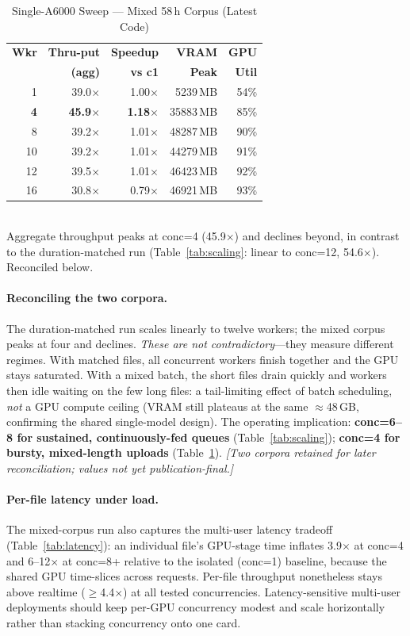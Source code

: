 \documentclass[conference,10pt]{IEEEtran}
\begin{document}
\begin{table}[!t]
\centering
\caption{Single-A6000 Sweep --- Mixed 58\,h Corpus (Latest Code)}
\label{tab:mixed}
\begin{tabular}{@{}rrrrr@{}}
\toprule
\textbf{Wkr} & \textbf{Thru-put} & \textbf{Speedup} & \textbf{VRAM} & \textbf{GPU} \\
             & \textbf{(agg)}    & \textbf{vs c1}   & \textbf{Peak} & \textbf{Util} \\
\midrule
1  & 39.0$\times$ & 1.00$\times$ & \num{5239}\,MB  & 54\% \\
\textbf{4}  & \textbf{45.9$\times$} & \textbf{1.18$\times$} & \num{35883}\,MB & 85\% \\
8  & 39.2$\times$ & 1.01$\times$ & \num{48287}\,MB & 90\% \\
10 & 39.2$\times$ & 1.01$\times$ & \num{44279}\,MB & 91\% \\
12 & 39.5$\times$ & 1.01$\times$ & \num{46423}\,MB & 92\% \\
16 & 30.8$\times$ & 0.79$\times$ & \num{46921}\,MB & 93\% \\
\bottomrule
\end{tabular}
\\[4pt]
{\footnotesize Aggregate throughput peaks at conc=4 (45.9$\times$) and declines beyond,
  in contrast to the duration-matched run (Table~\ref{tab:scaling}: linear to conc=12,
  54.6$\times$). Reconciled below.}
\end{table}

\paragraph{Reconciling the two corpora.}
The duration-matched run scales linearly to twelve workers; the mixed corpus peaks at four
and declines. \emph{These are not contradictory}---they measure different regimes. With
matched files, all concurrent workers finish together and the GPU stays saturated. With a
mixed batch, the short files drain quickly and workers then idle waiting on the few long
files: a tail-limiting effect of batch scheduling, \emph{not} a GPU compute ceiling (VRAM
still plateaus at the same $\approx$48\,GB, confirming the shared single-model design). The
operating implication: \textbf{conc=6--8 for sustained, continuously-fed queues}
(Table~\ref{tab:scaling}); \textbf{conc=4 for bursty, mixed-length uploads}
(Table~\ref{tab:mixed}). \emph{[Two corpora retained for later reconciliation; values not
yet publication-final.]}

\paragraph{Per-file latency under load.}
The mixed-corpus run also captures the multi-user latency tradeoff (Table~\ref{tab:latency}):
an individual file's GPU-stage time inflates 3.9$\times$ at conc=4 and 6--12$\times$ at
conc=8+ relative to the isolated (conc=1) baseline, because the shared GPU time-slices
across requests. Per-file throughput nonetheless stays above realtime ($\geq$4.4$\times$) at
all tested concurrencies. Latency-sensitive multi-user deployments should keep per-GPU
concurrency modest and scale horizontally rather than stacking concurrency onto one card.
\end{document}
